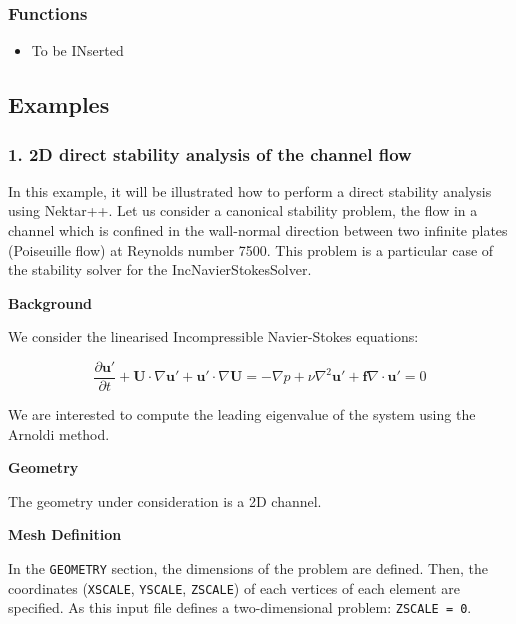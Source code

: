  \subsubsection{Functions}
 
 \begin{itemize}
 \item To be INserted
 \end{itemize}
 
 \subsection{Examples}
 
 \subsubsection{1. 2D direct stability analysis of the channel flow}
 
  In this example, it will be illustrated how to perform a direct stability analysis using Nektar++. Let us consider a canonical stability problem, the flow in a channel which is confined in the wall-normal direction between two infinite plates (Poiseuille flow) at Reynolds number 7500. This problem is a particular case of the stability solver for the IncNavierStokesSolver. 
  
 \textbf{Background}
 
  We consider the linearised Incompressible Navier-Stokes equations: 
  
  \begin{subequations}
  \begin{equation}
    \frac{\partial \mathbf{u'}}{\partial t} + \mathbf{U} \cdot  \nabla \mathbf{u'}+\mathbf{u'} \cdot \nabla \mathbf{U} = -\nabla p + \nu \nabla^2 \mathbf{u'} + \mathbf{f}
  \end{equation}
  
  \begin{equation}
  \nabla \cdot \mathbf{u'} = 0
  \end{equation}
  \end{subequations}
  
  We are interested to compute the leading eigenvalue of the system using the Arnoldi method.
  
  \textbf{Geometry}
  
   The geometry under consideration is a 2D channel. 
   
   \textbf{Mesh Definition}
   
   In the \texttt{GEOMETRY} section, the dimensions of the problem are defined. Then, the coordinates (\texttt{XSCALE}, \texttt{YSCALE}, \texttt{ZSCALE}) of each vertices of each element are specified. As this input file defines a two-dimensional problem: \texttt{ZSCALE = 0}. 
   
